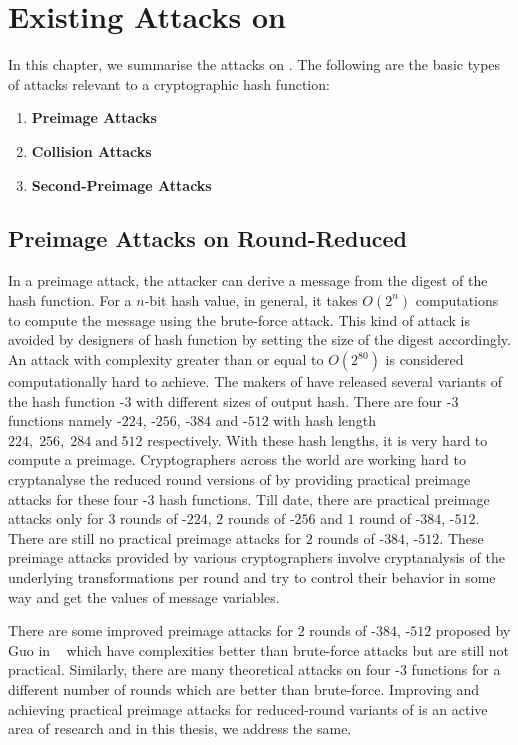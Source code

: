 \chapter{Existing Attacks on \KECCAK}

In this chapter, we summarise the attacks on \KECCAK{}. The following are the basic types of attacks relevant to a cryptographic hash function:
\begin{enumerate}
    \item \textbf{Preimage Attacks}
    \item \textbf{Collision Attacks}
    \item \textbf{Second-Preimage Attacks}
\end{enumerate}

\section{Preimage Attacks on Round-Reduced \KECCAK{}}

In a preimage attack, the attacker can derive a message from the digest of the hash function. For a $n$-bit hash value, in general, it takes $O(2^{n})$ computations to compute the message using the brute-force attack. This kind of attack is avoided by designers of hash function by setting the size of the digest accordingly. An attack with complexity greater than or equal to $O(2^{80})$ is considered computationally hard to achieve. The makers of \KECCAK{} have released several variants of the hash function \SHA-$3$ with different sizes of output hash. There are four \SHA-$3$ functions  namely -$224$, -$256$, -$384$ and -$512$ with hash length $224,\;256,\;284\;\text{and}\;512$ respectively. With these hash lengths, it is very hard to compute a preimage. Cryptographers across the world are working hard to cryptanalyse the reduced round versions of \KECCAK{} by providing practical preimage attacks for these four \SHA-$3$ hash functions. Till date, there are practical preimage attacks only for $3$ rounds of \KECCAK-$224$, $2$ rounds of \KECCAK-$256$ and $1$ round of \KECCAK-$384$, \KECCAK-$512$. There are still no practical preimage attacks for $2$ rounds of \KECCAK-$384$, \KECCAK-$512$. These preimage attacks provided by various cryptographers involve cryptanalysis of the underlying transformations per round and try to control their behavior in some way and get the values of message variables.

There are some improved preimage attacks for $2$ rounds of \KECCAK-$384$, \KECCAK-$512$ proposed by Guo \etal in ~\cite{guo2016linear} which have complexities better than brute-force attacks but are still not practical. Similarly, there are many theoretical attacks on four \SHA-$3$ functions for a different number of rounds which are better than brute-force. Improving and achieving practical preimage attacks for reduced-round variants of \KECCAK{} is an active area of research and in this thesis, we address the same.

